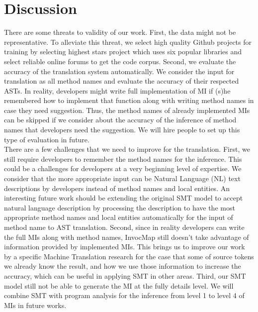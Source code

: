 \section{Discussion}
There are some threats to validity of our work. First, the data might not be representative. To alleviate this threat, we select high quality Github projects for training by selecting highest stars project which uses six popular libraries and select reliable online forums to get the code corpus.  Second, we evaluate the accuracy of the translation system automatically. We consider the input for translation as all method names and evaluate the accuracy of their respected ASTs. In reality, developers might write full implementation of MI if (s)he remembered how to implement that function along with writing method names in case they need suggestion. Thus, the method names of already implemented MIs can be skipped if we consider about the accuracy of the inference of method names that developers need the suggestion. We will hire people to set up this type of evaluation in future.\\
There are a few challenges that we need to improve for the translation. First, we still require developers to remember the method names for the inference. This could be a challenges for developers at a very beginning level of expertise. We consider that the more appropriate input can be Natural Language (NL) text descriptions by developers instead of method names and local entities. An interesting future work should be extending the original SMT model to accept natural language description by processing the description to have the most appropriate method names and local entities automatically for the input of method name to AST translation.  Second, since in reality developers can write the full MIs along with method names, InvocMap still doesn't take advantage of information provided by implemented MIs. This brings us to improve our work by a specific Machine Translation research for the case that some of source tokens we already know the result, and how we use those information to increase the accuracy, which can be useful  in applying SMT in other areas. Third, our SMT model still not be able to generate the MI at the fully details level. We will combine SMT with program analysis for the inference from level 1 to level 4 of MIs in future works. 
